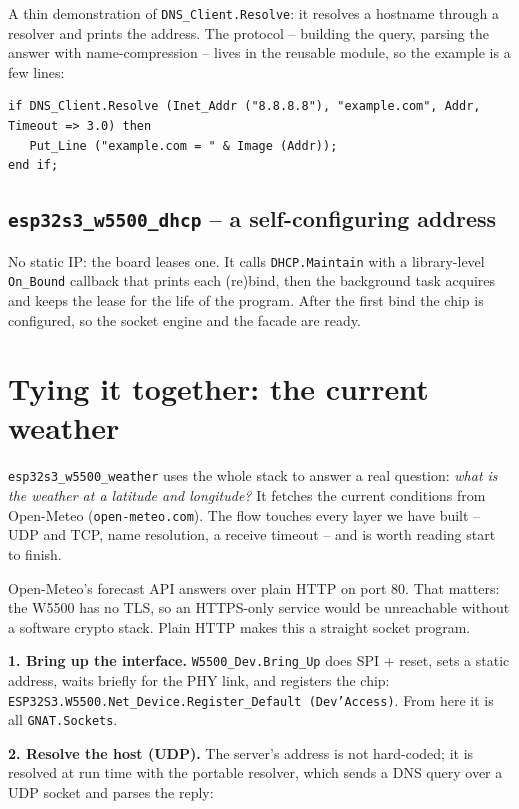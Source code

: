 A thin demonstration of \texttt{DNS\_Client.Resolve}: it resolves a hostname through
a resolver and prints the address. The protocol -- building the query, parsing the
answer with name-compression -- lives in the reusable module, so the example is a
few lines:

\begin{lstlisting}
if DNS_Client.Resolve (Inet_Addr ("8.8.8.8"), "example.com", Addr, Timeout => 3.0) then
   Put_Line ("example.com = " & Image (Addr));
end if;
\end{lstlisting}

\subsection{\texttt{esp32s3\_w5500\_dhcp} -- a self-configuring address}

No static IP: the board leases one. It calls \texttt{DHCP.Maintain} with a
library-level \texttt{On\_Bound} callback that prints each (re)bind, then the
background task acquires and keeps the lease for the life of the program. After the
first bind the chip is configured, so the socket engine and the facade are ready.

\section{Tying it together: the current weather}
\label{ch:net:weather}

\texttt{esp32s3\_w5500\_weather} uses the whole stack to answer a real question:
\emph{what is the weather at a latitude and longitude?} It fetches the current
conditions from Open-Meteo (\texttt{open-meteo.com}). The flow touches every layer
we have built -- UDP and TCP, name resolution, a receive timeout -- and is worth
reading start to finish.

Open-Meteo's forecast API answers over plain HTTP on port 80. That matters: the
W5500 has no TLS, so an HTTPS-only service would be unreachable without a software
crypto stack. Plain HTTP makes this a straight socket program.

\textbf{1. Bring up the interface.} \texttt{W5500\_Dev.Bring\_Up} does SPI + reset,
sets a static address, waits briefly for the PHY link, and registers the chip:
\texttt{ESP32S3.W5500.Net\_Device.Register\_Default (Dev'Access)}. From here it is
all \texttt{GNAT.Sockets}.

\textbf{2. Resolve the host (UDP).} The server's address is not hard-coded; it is
resolved at run time with the portable resolver, which sends a DNS query over a UDP
socket and parses the reply:

